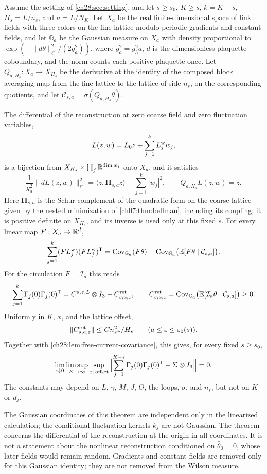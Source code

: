 \begin{theorem}\label{ch28:thm:maxwell-calibration}
Assume the setting of \cref{ch28:sec:setting}, and let $s\ge s_0$, $K\ge s$, $k=K-s$, $H_s=L/n_s$, and $a=L/N_K$. Let $X_a$ be the real finite-dimensional space of link fields with three colors on the fine lattice modulo periodic gradients and constant fields, and let $\mathbb G_a$ be the Gaussian measure on $X_a$ with density proportional to $\exp(-\|d\theta\|_{\ell^2}^2/(2g_a^2))$, where $g_a^2=g_3^2a$, $d$ is the dimensionless plaquette coboundary, and the norm counts each positive plaquette once. Let $Q_{a,H_s}:X_a\to X_{H_s}$ be the derivative at the identity of the composed block averaging map from the fine lattice to the lattice of side $n_s$, on the corresponding quotients, and let $\mathcal C_{s,a}=\sigma(Q_{a,H_s}\theta)$.

The differential of the reconstruction at zero coarse field and zero fluctuation variables,
\[
 L(z,w)=L_0z+\sum_{j=1}^kL_j^{\rm w}w_j,
\]
is a bijection from $X_{H_s}\times\prod_j\mathbb R^{\dim w_j}$ onto $X_a$, and it satisfies
\[
 \frac1{g_a^2}\|dL(z,w)\|_{\ell^2}^2=\langle z,\mathbf H_{s,a}z\rangle+\sum_{j=1}^k|w_j|^2,\qquad Q_{a,H_s}L(z,w)=z.
\]
Here $\mathbf H_{s,a}$ is the Schur complement of the quadratic form on the coarse lattice given by the nested minimization of \cref{ch07:thm:bellman}, including its coupling; it is positive definite on $X_{H_s}$, and its inverse is used only at this fixed $s$. For every linear map $F:X_a\to\mathbb R^d$,
\[
 \sum_{j=1}^k(FL_j^{\rm w})(FL_j^{\rm w})^{\mathsf T}=\operatorname{Cov}_{\mathbb G_a}(F\theta)-\operatorname{Cov}_{\mathbb G_a}\bigl(\mathbb E[F\theta\mid\mathcal C_{s,a}]\bigr).
\]
For the circulation $F=\mathcal I_a$ this reads
\[
 \sum_{j=1}^k\Gamma_j(0)\Gamma_j(0)^{\mathsf T}=C^{a,\varepsilon,L}\otimes I_3-C^{\rm ret}_{s,a,\varepsilon},\qquad C^{\rm ret}_{s,a,\varepsilon}=\operatorname{Cov}_{\mathbb G_a}\bigl(\mathbb E[\mathcal I_a\theta\mid\mathcal C_{s,a}]\bigr)\ge0.
\]
Uniformly in $K$, $x$, and the lattice offset,
\[
 \|C^{\rm ret}_{s,a,\varepsilon}\|\le Cn_s^2\varepsilon/H_s\qquad(a\le\varepsilon\le\varepsilon_0(s)).
\]
Together with \cref{ch28:lem:free-current-covariance}, this gives, for every fixed $s\ge s_0$,
\[
 \lim_{\varepsilon\downarrow0}\limsup_{K\to\infty}\sup_{x,\,\text{offset}}\Bigl\|\sum_{j=1}^{K-s}\Gamma_j(0)\Gamma_j(0)^{\mathsf T}-\Sigma\otimes I_3\Bigr\|=0.
\]
The constants may depend on $L$, $\gamma$, $M$, $J$, $\Theta$, the loops, $\sigma$, and $n_s$, but not on $K$ or $d_j$.
\end{theorem}

\begin{remark}\label{ch28:rem:linearized-only}
The Gaussian coordinates of this theorem are independent only in the linearized calculation; the conditional fluctuation kernels $k_j$ are not Gaussian. The theorem concerns the differential of the reconstruction at the origin in all coordinates. It is not a statement about the nonlinear reconstruction conditioned on $\widehat\theta_0=0$, whose later fields would remain random. Gradients and constant fields are removed only for this Gaussian identity; they are not removed from the Wilson measure.
\end{remark}

